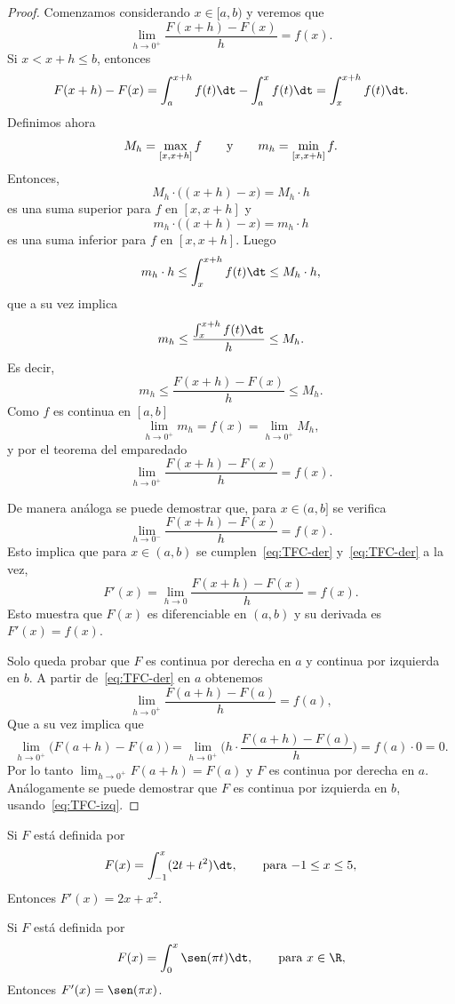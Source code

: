 \begin{proof}
  Comenzamos considerando $x\in[a,b)$ y veremos que 
  \[\lim_{h\to 0^+}\frac{F(x+h)-F(x)}{h}=f(x).\]
  Si $x<x+h\le b$, entonces
  \[F(x+h)-F(x)=\int_a^{x+h}f(t)\dt - \int_a^x f(t)\dt = \int_x^{x+h}f(t)\dt.\]
  Definimos ahora 
  $$ M_h = \max_{[x,x+h]}f\qquad\text y\qquad
  m_h = \min_{[x,x+h]}f.$$
  Entonces, 
  $$ M_h \cdot \big( (x+h)-x \big) = M_h \cdot h $$
  es una suma superior para $f$ en $[x,x+h]$ y
  $$ m_h \cdot \big( (x+h)-x \big) = m_h \cdot h $$ 
  es una suma inferior para $f$ en $[x,x+h]$.
  Luego
  $$ m_h \cdot h \le \int_x^{x+h}f(t)\dt \le M_h\cdot h,$$
  que a su vez implica
  $$ m_h \le \frac{\int_x^{x+h}f(t)\dt}h \le M_h.$$
  Es decir,
  $$ m_h \le \frac{F(x+h)-F(x)}h \le M_h.$$
  Como $f$ es continua en $[a,b]$
  \[
  \lim_{h\to0^+} m_h = f(x) = \lim_{h\to 0^+} M_h,
  \]
  y por el teorema del emparedado
  \begin{equation}\label{eq:TFC-der}
    \lim_{h\to 0^+} \frac{F(x+h)-F(x)}h = f(x).
  \end{equation}

  De manera análoga se puede demostrar que, para $x\in(a,b]$ se verifica
  \begin{equation}\label{eq:TFC-izq}
    \lim_{h\to 0^-} \frac{F(x+h)-F(x)}h = f(x).
  \end{equation}
  Esto implica que para $x\in(a,b)$ se cumplen~\eqref{eq:TFC-der} y~\eqref{eq:TFC-der} a la vez, 
  \[
  F'(x)= \lim_{h\to 0} \frac{F(x+h)-F(x)}h = f(x).
  \]
  Esto muestra que $F(x)$ es diferenciable en $(a,b)$ y su derivada es $F'(x)=f(x)$.

  Solo queda probar que $F$ es continua por derecha en $a$ y continua por izquierda en $b$.
  A partir de~\eqref{eq:TFC-der} en $a$ obtenemos
  $$ 
  \lim_{h\to 0^+} \frac{F(a+h)-F(a)}h = f(a),
  $$ 
  Que a su vez implica que
  $$ 
  \lim_{h\to 0^+} \big(F(a+h)-F(a)\big)
  = \lim_{h\to 0^+}\Big( h\cdot \frac{F(a+h)-F(a)}h \Big)= f(a)\cdot 0 = 0.
  $$ 
  Por lo tanto $\lim_{h\to 0^+} F(a+h)=F(a)$ y $F$ es continua por derecha en $a$.
  Análogamente se puede demostrar que $F$ es continua por izquierda en $b$, usando~\eqref{eq:TFC-izq}.
\end{proof}

\begin{example}
  Si $F$ está definida por 
  \[
  F(x)=\int_{-1}^x (2t+t^2) \dt,
  \qquad \text{para $-1\le x\le 5$},
  \]
  Entonces $F'(x) = 2x+x^2$.
\end{example}


\begin{example}
  Si $F$ está definida por 
  \[
  F(x)=\int_{0}^x \sen(\pi t) \dt,
  \qquad \text{para $x\in\R$},
  \]
  Entonces $F'(x) = \sen(\pi x)$.
\end{example}

